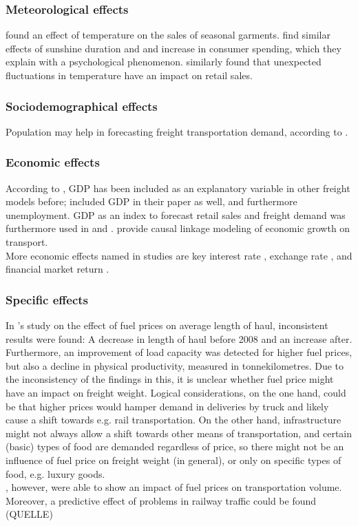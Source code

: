 \documentclass[a4paper, 11pt]{article}
\begin{document}
\subsubsection{Meteorological effects}

\cite{Bahng.2012} found an effect of temperature on the sales of seasonal garments.\cite{Murray.2010} find similar effects of sunshine duration and and increase in consumer spending, which they explain with a psychological phenomenon. \cite{Bertrand.2015} similarly found that unexpected fluctuations in temperature have an impact on retail sales. 

\subsubsection{Sociodemographical effects}

Population may help in forecasting freight transportation demand, according to \cite{Saidi.2017}.


\subsubsection{Economic effects}
According to \cite{JONG.2004}, GDP has been included as an explanatory variable in other freight models before; \cite{Intihar} included GDP in their paper as well, and furthermore unemployment. GDP as an index to forecast retail sales and freight demand was furthermore used in \cite{Guo.2013} and \cite{Fite.2002}. \cite{Saidi.2017} provide causal linkage modeling of economic growth on transport.\\
More economic effects named in studies are key interest rate \citep{Lahiri.2006}, exchange rate \cite{Kim.2011}, and financial market return \cite{Osadchiy.2013}.


\subsubsection{Specific effects}
In \cite{Abate.2014}'s study on the effect of fuel prices on average length of haul, inconsistent results were found: A decrease in length of haul before 2008 and an increase after. Furthermore, an improvement of load capacity was detected for higher fuel prices, but also a decline in physical productivity, measured in tonnekilometres.
Due to the inconsistency of the findings in this, it is unclear whether fuel price might have an impact on freight weight. Logical considerations, on the one hand, could be that higher prices would hamper demand in deliveries by truck and likely cause a shift towards e.g. rail transportation. On the other hand, infrastructure might not always allow a shift towards other means of transportation, and certain (basic) types of food are demanded regardless of price, so there might not be an influence of fuel price on freight weight (in general), or only on specific types of food, e.g. luxury goods.\\
\cite{Lahiri.2006}, however, were able to show an impact of fuel prices on transportation volume. \\
Moreover, a predictive effect of problems in railway traffic could be found (QUELLE)
\end{document}
